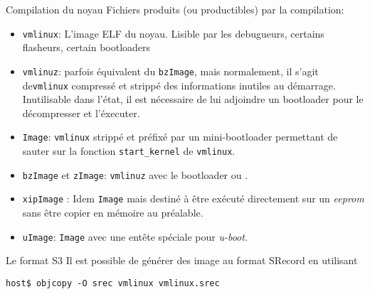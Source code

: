 \begin{frame}[fragile=singleslide]{Compilation du noyau}
  Fichiers produits (ou productibles) par la compilation:
  \begin{itemize}
  \item  \verb+vmlinux+:  L'image  ELF  du  noyau.   Lisible  par  les
    debugueurs, certains flasheurs, certain bootloaders
  \item  \verb+vmlinuz+: parfois  équivalent  du \verb+bzImage+,  mais
    normalement, il  s'agit de\verb+vmlinux+ compressé  et strippé des
    informations inutiles  au démarrage. Inutilisable  dans l'état, il
    est nécessaire de lui adjoindre un bootloader pour le décompresser
    et l'éxecuter.
  \item  \verb+Image+:  \verb+vmlinux+   strippé  et  préfixé  par  un
    mini-bootloader   permettant    de   sauter   sur    la   fonction
    \verb+start_kernel+ de \verb+vmlinux+.
  \item  \verb+bzImage+  et   \verb+zImage+:  \verb+vmlinuz+  avec  le
    bootloader  ou .
  \item  \verb+xipImage+  :  Idem  \verb+Image+ mais  destiné  à  être
    exécuté  directement  sur un  \emph{eeprom}  sans  être copier  en
    mémoire au préalable.
  \item  \verb+uImage+:  \verb+Image+ avec  une  entête spéciale  pour
    \emph{u-boot}.
  \end{itemize}
\end{frame}

\begin{frame}[fragile=singleslide]{Le format S3}
  Il est possible  de générer des image au  format SRecord en utilisant
  \begin{lstlisting}
host$ objcopy -O srec vmlinux vmlinux.srec
  \end{lstlisting}
\end{frame}

